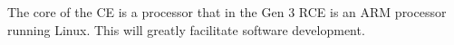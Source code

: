 The core of the CE is a processor that in the Gen 3 RCE is an ARM processor running Linux. 
This will greatly facilitate software development.







